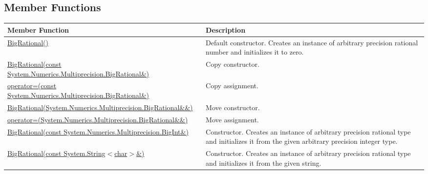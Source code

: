 \documentclass[a4paper,oneside,11.000000pt]{book}
\begin{document}
\subsection{Member Functions}
\begin{flushleft}
\begin{supertabular}[l]{!{\raggedright}p{7.575cm}!{\raggedright}p{7.575cm}}
\textbf{Member Function}
& \textbf{Description}
\\
\hline
\hyperlink{System.Numerics.Multiprecision.BigRational.constructor.P.System.Numerics.Multiprecision.BigRational}{BigRational()}
& Default constructor. Creates an instance of arbitrary precision rational number and initializes it to zero.

\\
\hyperlink{System.Numerics.Multiprecision.BigRational.constructor.P.System.Numerics.Multiprecision.BigRational.C.R.System.Numerics.Multiprecision.BigRational}{BigRational(const System.\-Numerics.\-Multiprecision.\-BigRational\&\-)}
& Copy constructor. 

\\
\hyperlink{System.Numerics.Multiprecision.BigRational.operator.assign.P.System.Numerics.Multiprecision.BigRational.C.R.System.Numerics.Multiprecision.BigRational}{operator=(const System.\-Numerics.\-Multiprecision.\-BigRational\&\-)}
& Copy assignment.

\\
\hyperlink{System.Numerics.Multiprecision.BigRational.constructor.P.System.Numerics.Multiprecision.BigRational.RR.System.Numerics.Multiprecision.BigRational}{BigRational(System.\-Numerics.\-Multiprecision.\-BigRational\&\-\&\-)}
& Move constructor.

\\
\hyperlink{System.Numerics.Multiprecision.BigRational.operator.assign.P.System.Numerics.Multiprecision.BigRational.RR.System.Numerics.Multiprecision.BigRational}{operator=(System.\-Numerics.\-Multiprecision.\-BigRational\&\-\&\-)}
& Move assignment.

\\
\hyperlink{System.Numerics.Multiprecision.BigRational.constructor.P.System.Numerics.Multiprecision.BigRational.C.R.System.Numerics.Multiprecision.BigInt}{BigRational(const System.\-Numerics.\-Multiprecision.\-BigInt\&\-)}
& Constructor. Creates an instance of arbitrary precision rational type and initializes it from the given arbitrary precision integer type.

\\
\hyperlink{System.Numerics.Multiprecision.BigRational.constructor.P.System.Numerics.Multiprecision.BigRational.C.R.System.String.char}{BigRational(const System.\-String$<$\-char$>$\-\&\-)}
& Constructor. Creates an instance of arbitrary precision rational type and initializes it from the given string.


\end{supertabular}
\end{flushleft}
\end{document}
